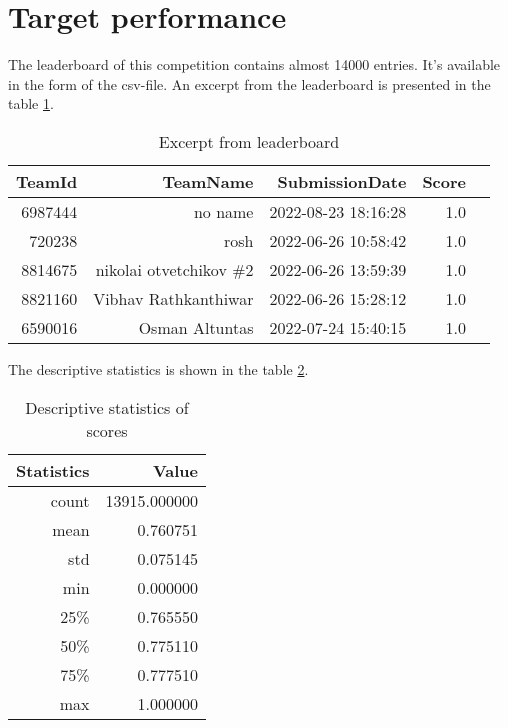 \section{Target performance}
The leaderboard of this competition contains almost 14000 entries. It's
available in the form of the csv-file. An excerpt from the leaderboard 
is presented in the table \ref{table:excert_from_leaderboard}.

\begin{table}[!ht]
	\centering
	\caption{Excerpt from leaderboard}
	\begin{tabular}{|r|r|r|r|r|}
		\hline
		\textbf{TeamId} & \textbf{TeamName}       & \textbf{SubmissionDate} & \textbf{Score} \\ \hline
		6987444         & no name                 & 2022-08-23 18:16:28     & 1.0            \\ \hline
		720238          & rosh                    & 2022-06-26 10:58:42     & 1.0            \\ \hline
		8814675         & nikolai otvetchikov \#2 & 2022-06-26 13:59:39     & 1.0            \\ \hline
		8821160         & Vibhav Rathkanthiwar    & 2022-06-26 15:28:12     & 1.0            \\ \hline
		6590016         & Osman Altuntas          & 2022-07-24 15:40:15     & 1.0            \\ \hline
	\end{tabular}
	\label{table:excert_from_leaderboard}
\end{table}

The descriptive statistics is shown in the table
\ref{table:scores_statistics}.

\begin{table}[!ht]
	\centering
	\caption{Descriptive statistics of scores}
	\begin{tabular}{|r|r|}
	\hline
		\textbf{Statistics} & \textbf{Value}        \\ \hline
		count               & 13915.000000          \\ \hline
		mean                & 0.760751              \\ \hline
		std                 & 0.075145              \\ \hline
		min                 & 0.000000              \\ \hline
		25\%                & 0.765550              \\ \hline
		50\%                & 0.775110              \\ \hline
		75\%                & 0.777510              \\ \hline
		max                 & 1.000000              \\ \hline
	\end{tabular}
	\label{table:scores_statistics}
\end{table}

